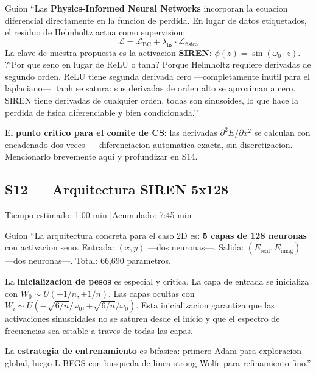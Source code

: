 \begin{slidebox}{Guion}
``Las \textbf{Physics-Informed Neural Networks} incorporan la ecuacion diferencial
directamente en la funcion de perdida. En lugar de datos etiquetados, el residuo
de Helmholtz actua como supervision:
\[
  \mathcal{L} = \mathcal{L}_\text{BC} + \lambda_\text{fis} \cdot \mathcal{L}_\text{fisica}
\]
La clave de nuestra propuesta es la activacion \textbf{SIREN}: $\phi(z) = \sin(\omega_0 \cdot z)$.
?`Por que seno en lugar de ReLU o tanh? Porque Helmholtz requiere derivadas de segundo
orden. ReLU tiene segunda derivada cero ---completamente inutil para el laplaciano---.
tanh se satura: sus derivadas de orden alto se aproximan a cero. SIREN tiene derivadas
de cualquier orden, todas son sinusoides, lo que hace la perdida de fisica diferenciable
y bien condicionada.''
\end{slidebox}
\vspace{4pt}

\begin{tipbox}
El \textbf{punto critico para el comite de CS}: las derivadas $\partial^2 E/\partial x^2$
se calculan con  encadenado dos veces --- diferenciacion
automatica exacta, sin discretizacion. Mencionarlo brevemente aqui y profundizar en S14.
\end{tipbox}

\vspace{8pt}

\subsection{S12 --- Arquitectura SIREN 5x128}

\begin{timebox}
Tiempo estimado: 1:00 min \quad|\quad Acumulado: 7:45 min
\end{timebox}
\vspace{4pt}

\begin{slidebox}{Guion}
``La arquitectura concreta para el caso 2D es: \textbf{5 capas de 128 neuronas}
con activacion seno. Entrada: $(x, y)$ ---dos neuronas---. Salida: $(E_\text{real},
E_\text{imag})$ ---dos neuronas---. Total: 66,690 parametros.

La \textbf{inicializacion de pesos} es especial y critica. La capa de entrada se
inicializa con $W_0 \sim U(-1/n, +1/n)$. Las capas ocultas con $W_i \sim U(-\sqrt{6/n}/\omega_0,
+\sqrt{6/n}/\omega_0)$. Esta inicializacion garantiza que las activaciones sinusoidales
no se saturen desde el inicio y que el espectro de frecuencias sea estable a traves de
todas las capas.

La \textbf{estrategia de entrenamiento} es bifasica: primero Adam para exploracion
global, luego L-BFGS con busqueda de linea strong Wolfe para refinamiento fino.''
\end{slidebox}
\vspace{4pt}

